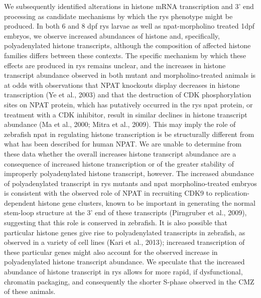 We subsequently identified alterations in histone mRNA transcription and 3’ end processing as candidate mechanisms by which the rys phenotype might be produced. In both 6 and 8 dpf rys larvae as well as npat-morpholino treated 1dpf embryos, we observe increased abundances of histone and, specifically, polyadenylated histone transcripts, although the composition of affected histone families differs between these contexts. The specific mechanism by which these effects are produced in rys remains unclear, and the increases in histone transcript abundance observed in both mutant and morpholino-treated animals is at odds with observations that NPAT knockouts display decreases in histone transcription (Ye et al., 2003) and that the destruction of CDK phosphorylation sites on NPAT protein, which has putatively occurred in the rys npat protein, or treatment with a CDK inhibitor, result in similar declines in histone transcript abundance (Ma et al., 2000; Mitra et al., 2009). This may imply the role of zebrafish npat in regulating histone transcription is be structurally different from what has been described for human NPAT. We are unable to determine from these data whether the overall increases histone transcript abundance are a consequence of increased histone transcription or of the greater stability of improperly polyadenylated histone transcript, however. The increased abundance of polyadenylated transcript in rys mutants and npat morpholino-treated embryos is consistent with the observed role of NPAT in recruiting CDK9 to replication-dependent histone gene clusters, known to be important in generating the normal stem-loop structure at the 3’ end of these transcripts (Pirngruber et al., 2009), suggesting that this role is conserved in zebrafish. It is also possible that particular histone genes give rise to polyadenylated transcripts in zebrafish, as observed in a variety of cell lines (Kari et al., 2013); increased transcription of these particular genes might also account for the observed increase in polyadenylated histone transcript abundance. We speculate that the increased abundance of histone transcript in rys allows for more rapid, if dysfunctional, chromatin packaging, and consequently the shorter S-phase observed in the CMZ of these animals.
